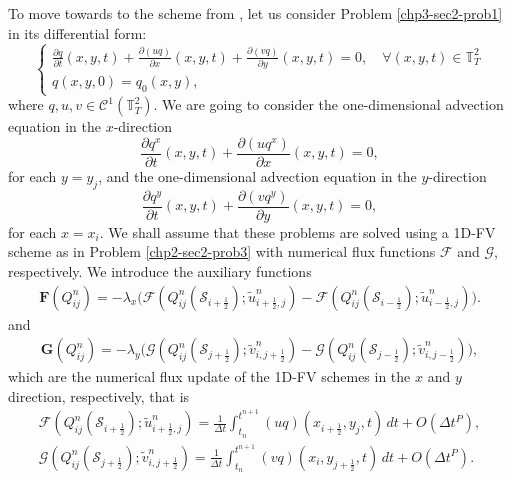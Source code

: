 To move towards to the scheme from  \citet{lin:1996}, let us consider Problem \ref{chp3-sec2-prob1}
in its differential form:
\begin{equation*}
	\label{chp3-adv2deq-xydir}
	\begin{cases}
		\frac{\partial q}{\partial t}(x, y, t) +
		\frac{\partial (uq)}{\partial x}(x, y, t) +
		\frac{\partial (vq)}{\partial y}(x, y, t) 
		= 0, \quad \forall (x, y, t) \in \mathbb{T}^2_T\\
		q(x,y,0) = q_0(x,y),
	\end{cases}
\end{equation*}
where $q,u,v \in \mathcal{C}^1{(\mathbb{T}^2_T)}$.
We are going to consider the one-dimensional advection equation in the $x$-direction
\begin{equation*}
	\label{chp3-adv2deq-xdir1}
	\frac{\partial q^x}{\partial t}(x, y, t) +
	\frac{\partial (uq^x)}{\partial x}(x, y, t)
	= 0,
\end{equation*}
for each $y = y_j$, and the one-dimensional advection equation in the $y$-direction
\begin{equation*}
	\label{chp3-adv2deq-ydir1}
	\frac{\partial q^y}{\partial t}(x, y, t) +
	\frac{\partial (vq^y)}{\partial y}(x, y, t)
	= 0,   
\end{equation*}
for each $x = x_i$. We shall assume that these problems are solved using a 1D-FV scheme as in Problem \ref{chp2-sec2-prob3}
with numerical flux functions $\mathcal{F}$ and $\mathcal{G}$, respectively. We introduce the auxiliary functions
\begin{align*}
	\mathbf{F}({{Q}_{ij}^n}) = -\lambda_x \big(\mathcal{F} (Q^n_{ij}(\mathcal{S}_{i+\frac{1}{2}}); \tilde{u}^n_{i+\frac{1}{2},j})- 
	\mathcal{F} (Q^n_{ij}(\mathcal{S}_{i-\frac{1}{2}}); \tilde{u}^n_{i-\frac{1}{2},j})\big).
\end{align*}
and
\begin{align*}
	\mathbf{G}({Q}_{ij}^n) = -\lambda_y \big( \mathcal{G} (Q^n_{ij}(\mathcal{S}_{j+\frac{1}{2}}); \tilde{v}^n_{i,j+\frac{1}{2}})- 
	\mathcal{G} (Q^n_{ij}(\mathcal{S}_{j-\frac{1}{2}}); \tilde{v}^n_{i,j-\frac{1}{2}}) \big),
\end{align*}
which are the numerical flux update of the 1D-FV schemes in the $x$ and $y$ direction, respectively, that is
\begin{align*}
	\mathcal{F} (Q^n_{ij}(\mathcal{S}_{i+\frac{1}{2}}); \tilde{u}^n_{i+\frac{1}{2},j}) = \frac{1}{\Delta t} \int_{t_n}^{t^{n+1}} (uq)(x_{i+\frac{1}{2}},y_j,t) \,dt + O(\Delta t^P)  ,\\
 	\mathcal{G} (Q^n_{ij}(\mathcal{S}_{j+\frac{1}{2}}); \tilde{v}^n_{i,j+\frac{1}{2}}) = \frac{1}{\Delta t} \int_{t_n}^{t^{n+1}} (vq)(x_i,y_{j+\frac{1}{2}},t) \,dt + O(\Delta t^P).
\end{align*}
